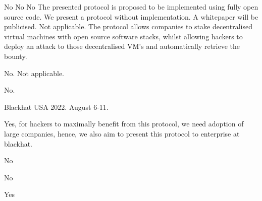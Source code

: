 \documentclass{article}
\begin{document}
No
No
No
The presented protocol is proposed to be implemented using fully open source code.
We present a protocol without implementation.
A whitepaper will be publicised. %
Not applicable.
The protocol allows companies to stake decentralised virtual machines with open source software stacks, whilst allowing hackers to deploy an attack to those decentralised VM's and automatically retrieve the bounty.

No.
Not applicable.

No.

Blackhat USA 2022. August 6-11.

Yes, for hackers to maximally benefit from this protocol, we need adoption of large companies, hence, we also aim to present this protocol to enterprise at blackhat.

No

No

Yes
\end{document}
